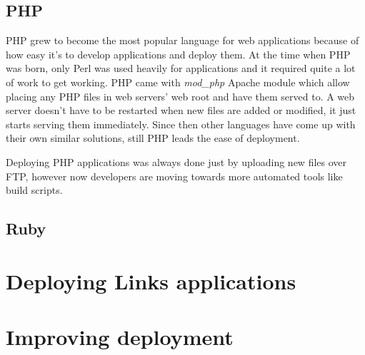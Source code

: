 \subsection{PHP}

PHP grew to become the most popular language for web applications because of how easy it's to develop applications and deploy them. At the time when PHP was born, only Perl was used heavily for applications and it required quite a lot of work to get working. PHP came with \textit{mod\_php} Apache module which allow placing any PHP files in web servers' web root and have them served to. A web server doesn't have to be restarted when new files are added or modified, it just starts serving them immediately. Since then other languages have come up with their own similar solutions, still PHP leads the ease of deployment.

Deploying PHP applications was always done just by uploading new files over FTP, however now developers are moving towards more automated tools like build scripts. 

\subsection{Ruby}

\section{Deploying Links applications}

\section{Improving deployment}
